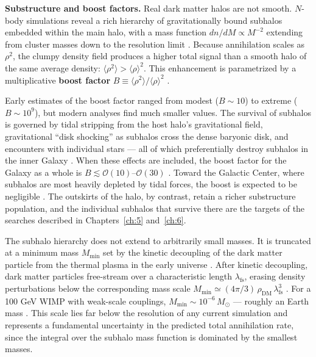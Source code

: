 \textbf{Substructure and boost factors.}
Real dark matter halos are not smooth.
$N$-body simulations reveal a rich hierarchy of gravitationally bound subhalos embedded within the main halo, with a mass function $dn/dM \propto M^{-2}$ extending from cluster masses down to the resolution limit \cite{Cirelli:2024ssz,Springel:2008cc}.
Because annihilation scales as $\rho^2$, the clumpy density field produces a higher total signal than a smooth halo of the same average density: $\langle \rho^2 \rangle > \langle \rho \rangle^2$.
This enhancement is parametrized by a multiplicative \textbf{boost factor} $B \equiv \langle \rho^2 \rangle / \langle \rho \rangle^2$ \cite{Cirelli:2024ssz}.

Early estimates of the boost factor ranged from modest ($B \sim 10$) to extreme ($B \sim 10^9$), but modern analyses find much smaller values.
The survival of subhalos is governed by tidal stripping from the host halo's gravitational field, gravitational ``disk shocking'' as subhalos cross the dense baryonic disk, and encounters with individual stars --- all of which preferentially destroy subhalos in the inner Galaxy \cite{Cirelli:2024ssz}.
When these effects are included, the boost factor for the Galaxy as a whole is $B \lesssim \mathcal{O}(10)$--$\mathcal{O}(30)$ \cite{Cirelli:2024ssz}.
Toward the Galactic Center, where subhalos are most heavily depleted by tidal forces, the boost is expected to be negligible \cite{Cirelli:2024ssz}.
The outskirts of the halo, by contrast, retain a richer substructure population, and the individual subhalos that survive there are the targets of the searches described in Chapters~\ref{ch:5} and~\ref{ch:6}.

The subhalo hierarchy does not extend to arbitrarily small masses.
It is truncated at a minimum mass $M_\text{min}$ set by the kinetic decoupling of the dark matter particle from the thermal plasma in the early universe \cite{Cirelli:2024ssz}.
After kinetic decoupling, dark matter particles free-stream over a characteristic length $\lambda_\text{fs}$, erasing density perturbations below the corresponding mass scale $M_\text{min} \simeq (4\pi/3)\, \rho_\text{DM}\, \lambda_\text{fs}^3$ \cite{Cirelli:2024ssz}.
For a 100 GeV WIMP with weak-scale couplings, $M_\text{min} \sim 10^{-6}\, M_\odot$ --- roughly an Earth mass \cite{Cirelli:2024ssz}.
This scale lies far below the resolution of any current simulation and represents a fundamental uncertainty in the predicted total annihilation rate, since the integral over the subhalo mass function is dominated by the smallest masses.

